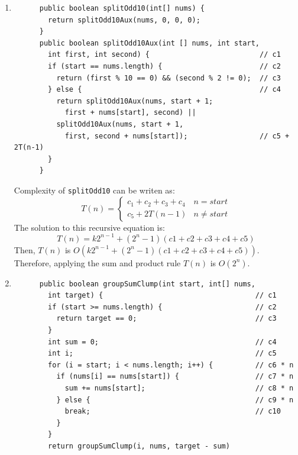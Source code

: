 \documentclass[a4paper,12pt]{article}
\begin{document}
\begin{enumerate}
      \item \begin{Verbatim}
      public boolean splitOdd10(int[] nums) {
        return splitOdd10Aux(nums, 0, 0, 0);
      }
      public boolean splitOdd10Aux(int [] nums, int start,
        int first, int second) {                          // c1
        if (start == nums.length) {                       // c2
          return (first % 10 == 0) && (second % 2 != 0);  // c3
        } else {                                          // c4
          return splitOdd10Aux(nums, start + 1;
            first + nums[start], second) ||
          splitOdd10Aux(nums, start + 1,
            first, second + nums[start]);                 // c5 + 2T(n-1)
        }
      }
      \end{Verbatim}
      Complexity of \texttt{splitOdd10} can be writen as:
      \begin{equation*}
        T\left(n\right)=\left\{\begin{array}{cc}c_1+c_2+c_3+c_4&n=start\\c_5+2T\left(n-1\right)&n\neq start\end{array}\right.
      \end{equation*}
      The solution to this recursive equation is:
      \begin{equation*}
        T\left( n \right)=k2^{n-1} + \left( 2^{n} - 1 \right) \left( c1 + c2 + c3 + c4 + c5 \right)
      \end{equation*}
      Then, $T\left(n\right)$ is $O\left(k2^{n-1} + \left( 2^{n} - 1 \right) \left( c1 + c2 + c3 + c4 + c5 \right)\right)$.\\
      Therefore, applying the sum and product rule $T(n)$ is $O(2^n)$.
      \item \begin{Verbatim}
      public boolean groupSumClump(int start, int[] nums,
        int target) {                                    // c1
        if (start >= nums.length) {                      // c2
          return target == 0;                            // c3
        }
        int sum = 0;                                     // c4
        int i;                                           // c5
        for (i = start; i < nums.length; i++) {          // c6 * n
          if (nums[i] == nums[start]) {                  // c7 * n
            sum += nums[start];                          // c8 * n
          } else {                                       // c9 * n
            break;                                       // c10
          }
        }
        return groupSumClump(i, nums, target - sum)

\end{Verbatim}
\end{enumerate}
\end{document}
